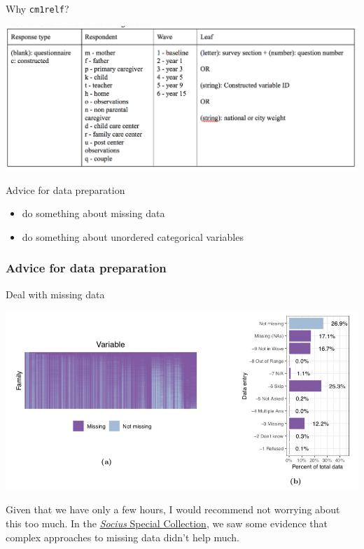 \documentclass[aspectratio=169]{beamer}
\begin{document}
\begin{frame}

Why \texttt{cm1relf}? \pause

\begin{center}
\includegraphics[width=\textwidth]{figures/ff_variablename_standards}
\end{center}

\end{frame}
\begin{frame}

Advice for data preparation
\begin{itemize}
\item do something about missing data
\item do something about unordered categorical variables
\end{itemize}

\end{frame}
\begin{frame}
\frametitle{Advice for data preparation}

Deal with missing data

\begin{center}
\includegraphics[width = \textwidth]{figures/salganik_measuring_2020_figs1}
\end{center}

\vfill
Given that we have only a few hours, I would recommend not worrying about this too much.  In the \href{https://journals.sagepub.com/topic/collections-srd/srd-1-fragile_families/srd}{\textit{Socius} Special Collection}, we saw some evidence that complex approaches to missing data didn't help much.
\end{frame}
\end{document}
